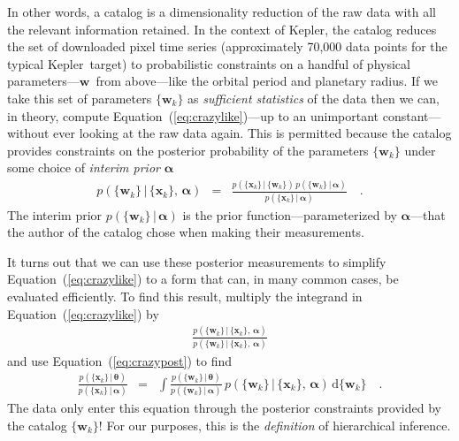 \documentclass[12pt,preprint]{aastex}
\newcommand{\project}[1]{{\sffamily #1}}
\newcommand{\kepler}{\project{Kepler}}
\newcommand{\Eq}[1]{Equation~(\ref{eq:#1})}
\newcommand{\eq}[1]{\Eq{#1}}
\newcommand{\eqlabel}[1]{\label{eq:#1}}
\newcommand{\dd}{\ensuremath{\,\mathrm{d}}}
\newcommand{\bvec}[1]{\ensuremath{\boldsymbol{#1}}}
\newcommand{\ratepar}{{\ensuremath{\theta}}}
\newcommand{\ratepars}{{\ensuremath{\bvec{\ratepar}}}}
\newcommand{\data}{{\ensuremath{\bvec{x}}}}
\newcommand{\entry}{{\ensuremath{\bvec{w}}}}
\newcommand{\interim}{{\ensuremath{\bvec{\alpha}}}}
\begin{document}
In other words, a catalog is a dimensionality reduction of the raw data with
all the relevant information retained.
In the context of \kepler, the catalog reduces the set of downloaded pixel
time series (approximately 70,000 data points for the typical \kepler\ target)
to probabilistic constraints on a handful of physical parameters---\entry\
from above---like the orbital period and planetary radius.
If we take this set of parameters $\{\entry_k\}$ as \emph{sufficient
statistics} of the data then we can, in theory, compute \eq{crazylike}---up to
an unimportant constant---without ever looking at the raw data again.
This is permitted because the catalog provides constraints on the posterior
probability of the parameters $\{\entry_k\}$ under some choice of
\emph{interim prior} \interim
\begin{eqnarray}\eqlabel{crazypost}
p(\{\entry_k\}\,|\,\{\data_k\},\,\interim) &=&
\frac{p(\{\data_k\}\,|\,\{\entry_k\})\,p(\{\entry_k\}\,|\,\interim)}
     {p(\{\data_k\}\,|\,\interim)} \quad.
\end{eqnarray}
The interim prior $p(\{\entry_k\}\,|\,\interim)$ is the prior
function---parameterized by \interim---that the author of the catalog chose
when making their measurements.

It turns out that we can use these posterior measurements to simplify
\eq{crazylike} to a form that can, in many common cases, be evaluated
efficiently.
To find this result, multiply the integrand in \eq{crazylike} by
\begin{eqnarray}
\frac{p(\{\entry_k\}\,|\,\{\data_k\},\,\interim)}
     {p(\{\entry_k\}\,|\,\{\data_k\},\,\interim)}
\end{eqnarray}
and use \eq{crazypost} to find
\begin{eqnarray}\eqlabel{simplemarglike}
\frac{p(\{\data_k\}\,|\,\ratepars)}{p(\{\data_k\}\,|\,\interim)} &=&
    \int
    \frac{p(\{\entry_k\}\,|\,\ratepars)}{p(\{\entry_k\}\,|\,\interim)}\,
    p(\{\entry_k\}\,|\,\{\data_k\},\,\interim)
    \dd\{\entry_k\} \quad.
\end{eqnarray}
The data only enter this equation through the posterior constraints provided
by the catalog $\{\entry_k\}$!
For our purposes, this is the \emph{definition} of hierarchical inference.
\end{document}
